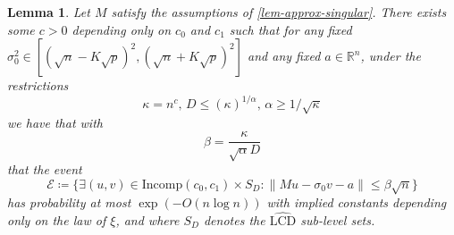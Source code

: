 \documentclass[11pt]{article}
\numberwithin{equation}{section}
\newtheorem{lemma}[theorem]{Lemma}
\theoremstyle{remark}
\newcommand{\R}{\mathbb{R}}
\newcommand{\Incomp}{\mathrm{Incomp}}
\newcommand{\rLCD}{\widehat{\mathrm{LCD}}}
\newcommand{\event}{\mathcal{E}}
\begin{document}
\begin{lemma}\label{lem-lcd-fixed-val}
   Let $M$ satisfy the assumptions of \cref{lem-approx-singular}. There exists some $c > 0$ depending only on $c_0$ and $c_1$ such that for any fixed $\sigma_0^2 \in [(\sqrt{n} - K\sqrt{p})^2, (\sqrt{n} + K\sqrt{p})^2]$ and any fixed $a \in \R^n$, under the restrictions
    \begin{equation*}
        \kappa = n^{c}, \, D \leq (\kappa)^{1/\alpha}, \, \alpha \geq 1/\sqrt{\kappa}
    \end{equation*}
    we have that with
    \begin{equation*}
        \beta = \frac{\kappa}{\sqrt{\alpha}D}
    \end{equation*}
    that the event
    \begin{equation*}
        \event \coloneqq \{ \exists (u, v) \in \Incomp(c_{0}, c_{1}) \times S_{D}: \|Mu - \sigma_0 v - a \| \leq \beta \sqrt{n} \} 
    \end{equation*}
    has probability at most $ \exp(-O(n \log n))$ with implied constants depending only on the law of $\xi$, and where $S_{D}$ denotes the $\rLCD$ sub-level sets.
\end{lemma}
\end{document}
